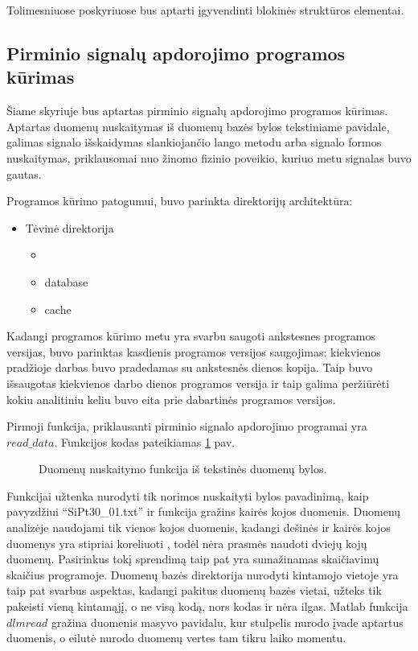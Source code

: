 \documentclass[]{vgtuef}
\begin{document}
Tolimesniuose poskyriuose bus aptarti įgyvendinti blokinės struktūros elementai.

\subsection{Pirminio signalų apdorojimo programos kūrimas}

Šiame skyriuje bus aptartas pirminio signalų apdorojimo programos
kūrimas. Aptartas duomenų nuskaitymas iš duomenų bazės bylos
tekstiniame pavidale, galimas signalo išskaidymas slankiojančio lango
metodu arba signalo formos nuskaitymas, priklausomai nuo žinomo
fizinio poveikio, kuriuo metu signalas buvo gautas.

Programos kūrimo patogumui, buvo parinkta direktorijų architektūra:

\begin{itemize}
\item Tėvinė direktorija
  \begin{itemize}
  \item <programos versija, nurodyta datos formatu>
  \item database
  \item cache
  \end{itemize}
\end{itemize}

Kadangi programos kūrimo metu yra svarbu saugoti ankstesnes programos
versijas, buvo parinktas kasdienis programos versijos saugojimas:
kiekvienos pradžioje darbas buvo pradedamas su ankstesnės dienos
kopija. Taip buvo išsaugotas kiekvienos darbo dienos programos versija
ir taip galima peržiūrėti kokiu analitiniu keliu buvo eita prie
dabartinės programos versijos.

Pirmoji funkcija, priklausanti pirminio signalo apdorojimo programai
yra $read\_data$. Funkcijos kodas pateikiamas \ref{code:read_data} pav.

\begin{figure}[t]
  \centering
  
  \caption{Duomenų nuskaitymo funkcija iš tekstinės duomenų bylos.}
  \label{code:read_data}
\end{figure}

Funkcijai užtenka nurodyti tik norimos nuskaityti bylos pavadinimą,
kaip pavyzdžiui ``SiPt30\_01.txt'' ir funkcija gražins kairės kojos
duomenis. Duomenų analizėje naudojami tik vienos kojos duomenis,
kadangi dešinės ir kairės kojos duomenys yra stipriai koreliuoti \cite{16053531},
todėl nėra prasmės naudoti dviejų kojų duomenų. Pasirinkus tokį
sprendimą taip pat yra sumažinamas skaičiavimų skaičius
programoje. Duomenų bazės direktorija nurodyti kintamojo vietoje yra
taip pat svarbus aspektas, kadangi pakitus duomenų bazės vietai,
užteks tik pakeisti vieną kintamąjį, o ne visą kodą, nors kodas ir
nėra ilgas. Matlab funkcija $dlmread$ gražina duomenis masyvo
pavidalu, kur stulpelis nurodo įvade aptartus duomenis, o eilutė
nurodo duomenų vertes tam tikru laiko momentu.
\end{document}
